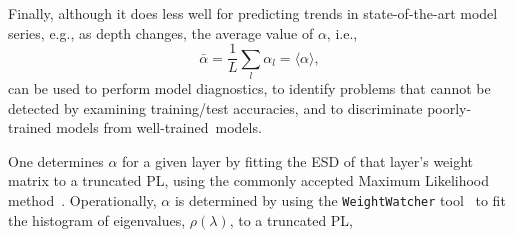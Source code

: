 \documentclass{article}
\begin{document}
Finally, although it does less well for predicting trends in state-of-the-art model series, e.g., as depth changes, the average value of $\alpha$, i.e., 
\begin{equation}
\bar{\alpha} = \dfrac{1}{L}\sum_l \alpha_l = \langle\alpha\rangle    ,
\label{eqn:alpha_bar}
\end{equation}
can be used to perform model diagnostics, to identify problems that cannot be detected by examining training/test accuracies, and to discriminate poorly-trained models from well-trained~models.


One determines $\alpha$ for a given layer by fitting the ESD of that layer's weight matrix to a truncated PL, using the commonly accepted Maximum Likelihood method~\cite{CSN09_powerlaw,ABP14}.
%
Operationally, $\alpha$ is determined by using the \texttt{WeightWatcher} tool~\cite{weightwatcher_package} to fit the histogram of eigenvalues, $\rho(\lambda)$, to a truncated PL, 

\end{document}
